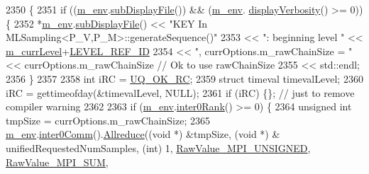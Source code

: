 \begin{DoxyCode}
2350 \{
2351     \textcolor{keywordflow}{if} ((\hyperlink{class_q_u_e_s_o_1_1_m_l_sampling_a13f1ca4fe9f94822fe572a743eaced1d}{m\_env}.\hyperlink{class_q_u_e_s_o_1_1_base_environment_a8a0064746ae8dddfece4229b9ad374d6}{subDisplayFile}()) && (\hyperlink{class_q_u_e_s_o_1_1_m_l_sampling_a13f1ca4fe9f94822fe572a743eaced1d}{m\_env}.
      \hyperlink{class_q_u_e_s_o_1_1_base_environment_a1fe5f244fc0316a0ab3e37463f108b96}{displayVerbosity}() >= 0)) \{
2352       *\hyperlink{class_q_u_e_s_o_1_1_m_l_sampling_a13f1ca4fe9f94822fe572a743eaced1d}{m\_env}.\hyperlink{class_q_u_e_s_o_1_1_base_environment_a8a0064746ae8dddfece4229b9ad374d6}{subDisplayFile}() << \textcolor{stringliteral}{"KEY In MLSampling<P\_V,P\_M>::generateSequence()"}
2353                               << \textcolor{stringliteral}{": beginning level "}              << 
      \hyperlink{class_q_u_e_s_o_1_1_m_l_sampling_af9416874c856e50f3b35270e801f17e4}{m\_currLevel}+\hyperlink{_m_l_sampling_level_options_8h_a68d15eaf394d210effcf584b938206d3}{LEVEL\_REF\_ID}
2354                               << \textcolor{stringliteral}{", currOptions.m\_rawChainSize = "} << currOptions.m\_rawChainSize \textcolor{comment}{// Ok to
       use rawChainSize}
2355                               << std::endl;
2356     \}
2357 
2358     \textcolor{keywordtype}{int} iRC = \hyperlink{namespace_q_u_e_s_o_a8e909502900aecf24cedba022ea84471}{UQ\_OK\_RC};
2359     \textcolor{keyword}{struct }timeval timevalLevel;
2360     iRC = gettimeofday(&timevalLevel, NULL);
2361     \textcolor{keywordflow}{if} (iRC) \{\}; \textcolor{comment}{// just to remove compiler warning}
2362 
2363     \textcolor{keywordflow}{if} (\hyperlink{class_q_u_e_s_o_1_1_m_l_sampling_a13f1ca4fe9f94822fe572a743eaced1d}{m\_env}.\hyperlink{class_q_u_e_s_o_1_1_base_environment_ae106b5bb8a80b655b88b3a26b1e7c185}{inter0Rank}() >= 0) \{
2364       \textcolor{keywordtype}{unsigned} \textcolor{keywordtype}{int} tmpSize = currOptions.m\_rawChainSize;
2365       \hyperlink{class_q_u_e_s_o_1_1_m_l_sampling_a13f1ca4fe9f94822fe572a743eaced1d}{m\_env}.\hyperlink{class_q_u_e_s_o_1_1_base_environment_a689e4d140c74d495d97eb498714a4b82}{inter0Comm}().\hyperlink{class_q_u_e_s_o_1_1_mpi_comm_a72e137e60ef8060efb1ee5fc874fa4b8}{Allreduce}((\textcolor{keywordtype}{void} *) &tmpSize, (\textcolor{keywordtype}{void} *) &
      unifiedRequestedNumSamples, (\textcolor{keywordtype}{int}) 1, \hyperlink{_mpi_comm_8h_a06cbfbc33436f6e0dc8a48ff3c49bdfc}{RawValue\_MPI\_UNSIGNED}, \hyperlink{_mpi_comm_8h_afbf78d291c032aa7f512bc566cee2bd1}{RawValue\_MPI\_SUM},

\end{DoxyCode}
